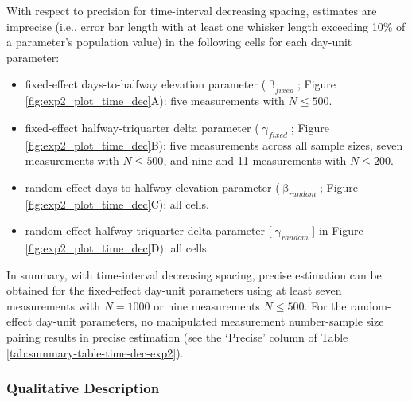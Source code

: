 \documentclass[
12pt, %
twoside,
english]{guelphthesis}
\theoremstyle{definition}
\theoremstyle{definition}
\theoremstyle{definition}
\theoremstyle{definition}
\theoremstyle{remark}
\begin{document}
With respect to precision for time-interval decreasing spacing, estimates are imprecise (i.e., error bar length with at least one whisker length exceeding 10\% of a parameter's population value) in the following cells for each day-unit parameter:
\begin{itemize}
\tightlist
\item
  fixed-effect days-to-halfway elevation parameter (\(\upbeta_{fixed}\); Figure \ref{fig:exp2_plot_time_dec}A): five measurements with \(N \le 500\).
\item
  fixed-effect halfway-triquarter delta parameter (\(\upgamma_{fixed}\); Figure \ref{fig:exp2_plot_time_dec}B): five measurements across all sample sizes, seven measurements with \(N \le 500\), and nine and 11 measurements with \(N \le 200\).
\item
  random-effect days-to-halfway elevation parameter (\(\upbeta_{random}\); Figure \ref{fig:exp2_plot_time_dec}C): all cells.
\item
  random-effect halfway-triquarter delta parameter {[}\(\upgamma_{random}\){]} in Figure \ref{fig:exp2_plot_time_dec}D): all cells.
\end{itemize}
In summary, with time-interval decreasing spacing, precise estimation can be obtained for the fixed-effect day-unit parameters using at least seven measurements with \(N = 1000\) or nine measurements \(N \le 500\). For the random-effect day-unit parameters, no manipulated measurement number-sample size pairing results in precise estimation (see the `Precise' column of Table \ref{tab:summary-table-time-dec-exp2}).

\hypertarget{qualitative-time-dec-exp2}{%
\subsubsection{Qualitative Description}\label{qualitative-time-dec-exp2}}
\end{document}
